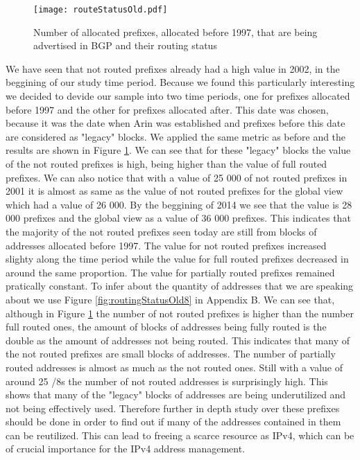 \documentclass[11pt,a4paper]{scrreprt}
\begin{document}
\begin{figure}[!h]
\centering
\texttt{[image: routeStatusOld.pdf]}
\caption{Number of allocated prefixes, allocated before 1997, that are being advertised in BGP and their routing status}
\label{fig:routingStatusOld}
\end{figure}

We have seen that not routed prefixes already had a high value in 2002, in the beggining of our study time period. Because we found this particularly interesting we decided to devide our sample into two time periods, one for prefixes allocated before 1997 and the other for prefixes allocated after. This date was chosen, because it was the date when Arin was established and prefixes before this date are considered as "legacy" blocks. 
We applied the same metric as before and the results are shown in Figure \ref{fig:routingStatusOld}. We can see that for these "legacy" blocks the value of the not routed prefixes is high, being higher than the value of full routed prefixes. We can also notice that with a value of 25 000 of not routed prefixes in 2001 it is almost as same as the value of not routed prefixes for the global view which had a value of 26 000. By the beggining of 2014 we see that the value is 28 000 prefixes and the global view as a value of 36 000 prefixes. This indicates that the majority of the not routed prefixes seen today are still from blocks of addresses allocated before 1997. The value for not routed prefixes increased slighty along the time period while the value for full routed prefixes decreased in around the same proportion. The value for partially routed prefixes remained pratically constant. 
To infer about the quantity of addresses that we are speaking about we use Figure \ref{fig:routingStatusOld8} in Appendix B. We can see that, although in Figure \ref{fig:routingStatusOld} the number of not routed prefixes is higher than the number full routed ones, the amount of blocks of addresses being fully routed is the double as the amount of addresses not being routed. This indicates that many of the not routed prefixes are small blocks of addresses. 
The number of partially routed addresses is almost as much as the not routed ones. Still with a value of around 25 /8s the number of not routed addresses is surprisingly high. This shows that many of the "legacy" blocks of addresses are being underutilized and not being effectively used. Therefore further in depth study over these prefixes should be done in order to find out if many of the addresses contained in them can be reutilized. This can lead to freeing a scarce resource as IPv4, which can be of crucial importance for the IPv4 address management.
\end{document}
